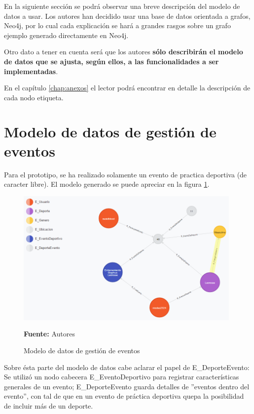 En la siguiente sección se podrá observar una breve descripción del modelo de datos a usar. Los autores han decidido usar una base de datos orientada a grafos, Neo4j, por lo cual cada explicación se hará a grandes rasgos sobre un grafo ejemplo generado directamente en Neo4j.

Otro dato a tener en cuenta será que los autores \textbf{sólo describirán el modelo de datos que se ajusta, según ellos, a las funcionalidades a ser implementadas}.

En el capítulo \ref{chap:anexos} el lector podrá encontrar en detalle la descripción de cada nodo etiqueta.

\section{Modelo de datos de gestión de eventos}

Para el prototipo, se ha realizado solamente un evento de practica deportiva (de caracter libre). El modelo generado se puede apreciar en la figura \ref{fig:modelo_datos_gestion_eventos}.

\begin{figure}[!htb]
  \begin{center}
    \includegraphics[width=11cm]{./imagenes/Modelo_de_datos/Gestion_eventos.png}
    \caption{Modelo de datos de gestión de eventos}
    \label{fig:modelo_datos_gestion_eventos}
    \textbf{Fuente:}  Autores
  \end{center}
\end{figure}

Sobre ésta parte del modelo de datos cabe aclarar el papel de E\_DeporteEvento: Se utilizó un nodo cabecera E\_EventoDeportivo para registrar características generales de un evento; E\_DeporteEvento guarda detalles de ''eventos dentro del evento'', con tal de que en un evento de práctica deportiva quepa la posibilidad de incluir más de un deporte.

